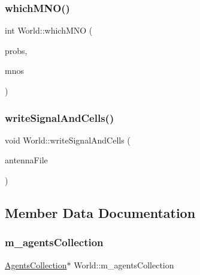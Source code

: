\mbox{\label{class_world_a9a982977a44c9e8a4724eaa1e4108679}} 
\subsubsection{\texorpdfstring{which\+M\+N\+O()}{whichMNO()}}
{\footnotesize\ttfamily int World\+::which\+M\+NO (\begin{DoxyParamCaption}\item[{vector$<$ pair$<$ string, double $>$$>$}]{probs,  }\item[{vector$<$ \hyperlink{class_mobile_operator}{Mobile\+Operator} $\ast$$>$}]{mnos }\end{DoxyParamCaption})\hspace{0.3cm}{\ttfamily [private]}}

\mbox{\label{class_world_a3f069fb694d8f17b23bda291bea47446}} 
\subsubsection{\texorpdfstring{write\+Signal\+And\+Cells()}{writeSignalAndCells()}}
{\footnotesize\ttfamily void World\+::write\+Signal\+And\+Cells (\begin{DoxyParamCaption}\item[{ostream \&}]{antenna\+File }\end{DoxyParamCaption})\hspace{0.3cm}{\ttfamily [private]}}



\subsection{Member Data Documentation}
\mbox{\label{class_world_ae1262689381f00828c0a639b7cbb52a3}} 
\subsubsection{\texorpdfstring{m\+\_\+agents\+Collection}{m\_agentsCollection}}
{\footnotesize\ttfamily \hyperlink{class_agents_collection}{Agents\+Collection}$\ast$ World\+::m\+\_\+agents\+Collection\hspace{0.3cm}{\ttfamily [private]}}

